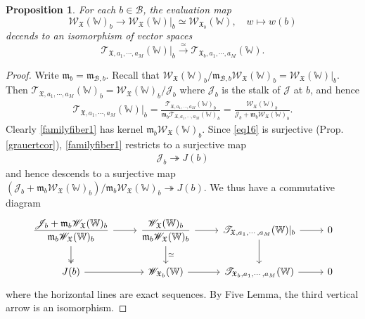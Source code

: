 \documentclass[11pt,b5paper,notitlepage]{article}
\theoremstyle{definition}
\theoremstyle{plain}
\newtheorem{pp}[df]{Proposition}
\newcommand{\fk}{\mathfrak}
\newcommand{\mc}{\mathcal}
\newcommand{\scr}{\mathscr}
\newcommand{\Wbb}{\mathbb W}
\newcommand{\<}{\left\langle}
\renewcommand{\>}{\right\rangle}
\newcommand{\MB}{\mathcal{B}}
\newcommand{\fx}{\mathfrak{X}}
\newcommand{\ST}{\mathscr{T}}
\newcommand{\SW}{\mathscr{W}}
\newcommand{\mk}{\mathfrak m}
\numberwithin{equation}{section}
\begin{document}
\begin{pp}
    For each $b\in \MB$, the evaluation map
    \begin{equation}\label{familyfiber1}
        \SW_\fx(\Wbb)_b\rightarrow \SW_{\fk X}(\Wbb)|_b\simeq\SW_{\fx_b}(\Wbb),\quad w\mapsto w(b)
    \end{equation}
    decends to an isomorphism of vector spaces
    $$
    \ST_{\fx,a_1,\cdots,a_M}(\Wbb)\vert_b \xrightarrow{\simeq} \ST_{\fx_b,a_1,\cdots,a_M}(\Wbb).
    $$
\end{pp}
\begin{proof}
Write $\mk_b=\mk_{\mc B,b}$. Recall that $\scr W_{\fk X}(\Wbb)_b/\fk m_{\mc B,b}\scr W_{\fk X}(\Wbb)_b=\scr W_{\fk X}(\Wbb)|_b$. Then $\ST_{\fx,a_1,\cdots,a_M}(\Wbb)_b=\scr W_{\fk X}(\Wbb)_b/\scr J_b$ where $\scr J_b$ is the stalk of $\scr J$ at $b$, and hence 
\begin{align*}
\ST_{\fx,a_1,\cdots,a_M}(\Wbb)|_b=\frac{\ST_{\fx,a_1,\cdots,a_M}(\Wbb)_b}{\mk_b\ST_{\fx,a_1,\cdots,a_M}(\Wbb)_b}=\frac{\scr W_{\fk X}(\Wbb)_b}{\scr J_b+\fk m_b\scr W_{\fk X}(\Wbb)_b}.
\end{align*}
Clearly \eqref{familyfiber1} has kernel $\mk_b\scr W_{\fk X}(\Wbb)_b$. Since \eqref{eq16} is surjective (Prop. \ref{grauertcor}),  \eqref{familyfiber1} restricts to a surjective map 
\begin{gather}
\scr J_b\twoheadrightarrow J(b)  \label{eq17}
\end{gather}
and hence descends to a surjective map $(\scr J_b+\mk_b\scr W_{\fk X}(\Wbb)_b)/\mk_b\scr W_{\fk X}(\Wbb)_b\twoheadrightarrow J(b)$. We thus have a commutative diagram
\begin{equation*}
\begin{tikzcd}
\displaystyle\frac{\scr J_b+\mk_b\scr W_{\fk X}(\Wbb)_b}{\mk_b\scr W_{\fk X}(\Wbb)_b} \arrow[d, two heads] \arrow[r] & \displaystyle \frac{\scr W_{\fk X}(\Wbb)_b}{\mk_b\scr W_{\fk X}(\Wbb)_b}  \arrow[r] \arrow[d,"\simeq"] & \ST_{\fx,a_1,\cdots,a_M}(\Wbb)|_b \arrow[r] \arrow[d] & 0 \\
J(b) \arrow[r]                      & \scr W_{\fk X_b}(\Wbb) \arrow[r]           & \ST_{\fx_b,a_1,\cdots,a_M}(\Wbb) \arrow[r]           & 0
\end{tikzcd}
\end{equation*}
where the horizontal lines are exact sequences. By Five Lemma, the third vertical arrow is an isomorphism.
\end{proof}
\end{document}
